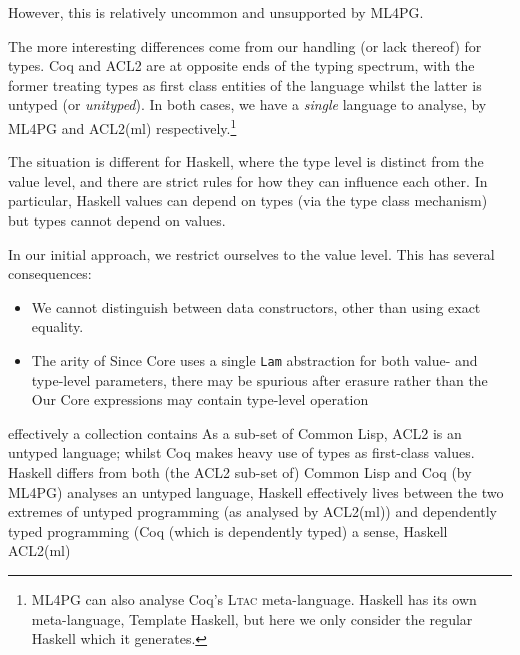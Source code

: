 However, this is relatively uncommon and unsupported by ML4PG.

\iffalse
TODO
Replacing mutually-recursive calls (i.e. unknown global references) by the \hs{sUNKNOWN} sentinel, has the effect of denotes an has a similar effect to a consistently
\fi

The more interesting differences come from our handling (or lack thereof) for types. Coq and ACL2 are at opposite ends of the typing spectrum, with the former treating types as first class entities of the language whilst the latter is untyped (or \emph{unityped}). In both cases, we have a \emph{single} language to analyse, by ML4PG and ACL2(ml) respectively.\footnote{ML4PG can also analyse Coq's \textsc{Ltac} meta-language. Haskell has its own meta-language, Template Haskell, but here we only consider the regular Haskell which it generates.}

The situation is different for Haskell, where the type level is distinct from the value level, and there are strict rules for how they can influence each other. In particular, Haskell values can depend on types (via the type class mechanism) but types cannot depend on values.

In our initial approach, we restrict ourselves to the value level. This has several consequences:

\begin{itemize}
  \item We cannot distinguish between data constructors, other than using exact equality.
  \item The arity of Since Core uses a single \texttt{Lam} abstraction for both value- and type-level parameters, there may be spurious after erasure rather than the Our Core expressions may contain type-level operation
\end{itemize}

effectively a collection contains  As a sub-set of Common Lisp, ACL2 is an untyped language; whilst Coq makes heavy use of types as first-class values.  Haskell differs from both (the ACL2 sub-set of) Common Lisp and Coq (by ML4PG) analyses an untyped language, Haskell effectively lives between the two extremes of untyped programming (as analysed by ACL2(ml)) and dependently typed programming (Coq (which is dependently typed) a sense, Haskell ACL2(ml)
